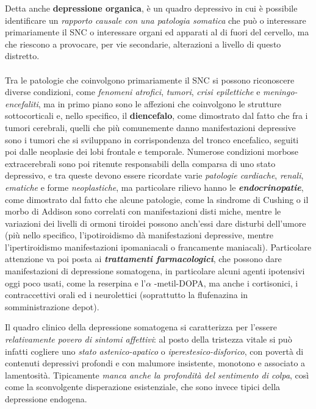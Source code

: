 Detta anche \textbf{depressione organica}, è un quadro depressivo in cui
è possibile identificare un \emph{rapporto causale con una patologia
somatica} che può o interessare primariamente il SNC o interessare
organi ed apparati al di fuori del cervello, ma che riescono a
provocare, per vie secondarie, alterazioni a livello di questo
distretto.
\\\\
Tra le patologie che coinvolgono primariamente il SNC si possono
riconoscere diverse condizioni, come \emph{fenomeni atrofici},
\emph{tumori}, \emph{crisi epilettiche} e \emph{meningo-encefaliti}, ma
in primo piano sono le affezioni che coinvolgono le strutture
sottocorticali e, nello specifico, il \textbf{diencefalo}, come
dimostrato dal fatto che fra i tumori cerebrali, quelli che più
comunemente danno manifestazioni depressive sono i tumori che si
sviluppano in corrispondenza del tronco encefalico, seguiti poi dalle
neoplasie dei lobi frontale e temporale. Numerose condizioni morbose
extracerebrali sono poi ritenute responsabili della comparsa di uno
stato depressivo, e tra queste devono essere ricordate varie
\emph{patologie cardiache}, \emph{renali}, \emph{ematiche} e forme
\emph{neoplastiche}, ma particolare rilievo hanno le
\textbf{\emph{endocrinopatie}}, come dimostrato dal fatto che alcune
patologie, come la sindrome di Cushing o il morbo di Addison sono
correlati con manifestazioni disti miche, mentre le variazioni dei
livelli di ormoni tiroidei possono anch'essi dare disturbi dell'umore
(più nello specifico, l'ipotiroidismo dà manifestazioni depressive,
mentre l'ipertiroidismo manifestazioni ipomaniacali o francamente
maniacali). Particolare attenzione va poi posta ai
\textbf{\emph{trattamenti farmacologici}}, che possono dare
manifestazioni di depressione somatogena, in particolare alcuni agenti
ipotensivi oggi poco usati, come la reserpina e l'$\alpha$ -metil-DOPA, ma anche
i cortisonici, i contraccettivi orali ed i neurolettici (soprattutto la
flufenazina in somministrazione depot).

Il quadro clinico della depressione somatogena si caratterizza per
l'essere \emph{relativamente povero di sintomi affettivi}: al posto
della tristezza vitale si può infatti cogliere uno \emph{stato
astenico-apatico} o \emph{iperestesico-disforico}, con povertà di
contenuti depressivi profondi e con malumore insistente, monotono e
associato a lamentosità. Tipicamente \emph{manca anche la profondità del
sentimento di colpa}, così come la sconvolgente disperazione
esistenziale, che sono invece tipici della depressione endogena.

